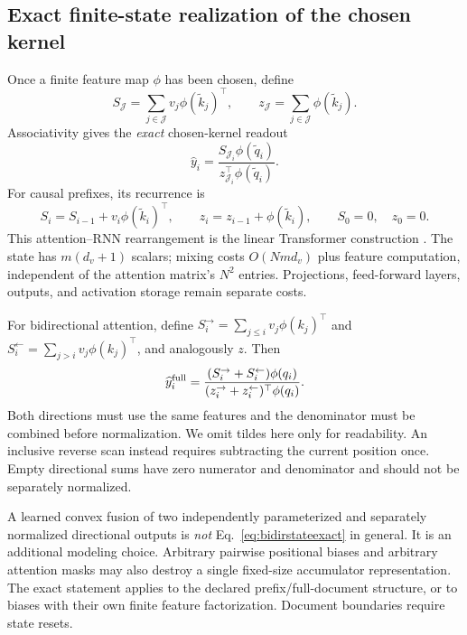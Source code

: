 \documentclass{article}
\theoremstyle{remark}\newtheorem{remark}[theorem]{Remark}
\begin{document}
\subsection{Exact finite-state realization of the chosen kernel}
Once a finite feature map $\phi$ has been chosen, define
\begin{equation}
 S_{\mathcal J}=\sum_{j\in\mathcal J}v_j\phi(\widetilde k_j)^\top,
 \qquad z_{\mathcal J}=\sum_{j\in\mathcal J}\phi(\widetilde k_j).
\end{equation}
Associativity gives the \emph{exact} chosen-kernel readout
\begin{equation}
 \widehat y_i=\frac{S_{\mathcal J_i}\phi(\widetilde q_i)}
 {z_{\mathcal J_i}^{\top}\phi(\widetilde q_i)}.
 \label{eq:kernelstate}
\end{equation}
For causal prefixes, its recurrence is
\begin{equation}
 S_i=S_{i-1}+v_i\phi(\widetilde k_i)^\top,\qquad
 z_i=z_{i-1}+\phi(\widetilde k_i),\qquad S_0=0,
 \quad z_0=0.
 \label{eq:additivestate}
\end{equation}
This attention--RNN rearrangement is the linear Transformer construction \cite{lineartransformer}. The state has $m(d_v+1)$ scalars; mixing costs $O(Nmd_v)$ plus feature computation, independent of the attention matrix's $N^2$ entries. Projections, feed-forward layers, outputs, and activation storage remain separate costs.

For bidirectional attention, define $S_i^\rightarrow=\sum_{j\le i}v_j\phi(k_j)^\top$ and $S_i^\leftarrow=\sum_{j>i}v_j\phi(k_j)^\top$, and analogously $z$. Then
\begin{equation}
 \widehat y_i^{\rm full}=
 \frac{(S_i^\rightarrow+S_i^\leftarrow)\phi(q_i)}
 {(z_i^\rightarrow+z_i^\leftarrow)^\top\phi(q_i)}.
 \label{eq:bidirstateexact}
\end{equation}
Both directions must use the same features and the denominator must be combined before normalization. We omit tildes here only for readability. An inclusive reverse scan instead requires subtracting the current position once. Empty directional sums have zero numerator and denominator and should not be separately normalized.

A learned convex fusion of two independently parameterized and separately normalized directional outputs is \emph{not} Eq.~\eqref{eq:bidirstateexact} in general. It is an additional modeling choice. Arbitrary pairwise positional biases and arbitrary attention masks may also destroy a single fixed-size accumulator representation. The exact statement applies to the declared prefix/full-document structure, or to biases with their own finite feature factorization. Document boundaries require state resets.
\end{document}

